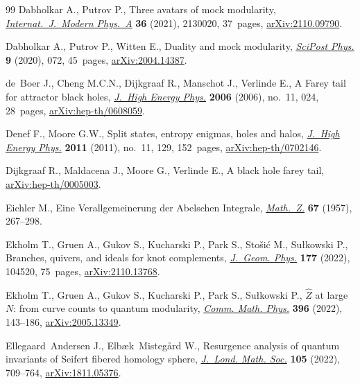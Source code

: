 \documentclass[10pt,a4paper]{amsart}
\theoremstyle{definition}
\numberwithin{equation}{section}
\begin{document}
\begin{thebibliography}{99}
Dabholkar A., Putrov P., Three avatars of mock modularity,
 \href{https://doi.org/10.1142/S0217751X21300209}{\textit{Internat.~J.~Modern Phys.~A}} \textbf{36} (2021), 2130020, 37~pages,
 \href{https://arxiv.org/abs/2110.09790}{arXiv:2110.09790}.

Dabholkar A., Putrov P., Witten E., Duality and mock modularity,
 \href{https://doi.org/10.21468/scipostphys.9.5.072}{\textit{SciPost Phys.}} \textbf{9} (2020), 072, 45~pages, \href{https://arxiv.org/abs/2004.14387}{arXiv:2004.14387}.

de~Boer J., Cheng M.C.N., Dijkgraaf R., Manschot J., Verlinde E., A {F}arey
 tail for attractor black holes, \href{https://doi.org/10.1088/1126-6708/2006/11/024}{\textit{J.~High Energy Phys.}} \textbf{2006}
 (2006), no.~11, 024, 28~pages, \href{https://arxiv.org/abs/hep-th/0608059}{arXiv:hep-th/0608059}.

Denef F., Moore G.W., Split states, entropy enigmas, holes and halos,
 \href{https://doi.org/10.1007/JHEP11(2011)129}{\textit{J.~High Energy Phys.}} \textbf{2011} (2011), no.~11, 129, 152~pages,
 \href{https://arxiv.org/abs/hep-th/0702146}{arXiv:hep-th/0702146}.

Dijkgraaf R., Maldacena J., Moore G., Verlinde E., A black hole farey tail,
 \href{https://arxiv.org/abs/hep-th/0005003}{arXiv:hep-th/0005003}.

Eichler M., Eine {V}erallgemeinerung der {A}belschen {I}ntegrale,
 \href{https://doi.org/10.1007/BF01258863}{\textit{Math.~Z.}} \textbf{67} (1957), 267--298.

Ekholm T., Gruen A., Gukov S., Kucharski P., Park S., Sto\v{s}i\'c M.,
 Su{\l}kowski P., Branches, quivers, and ideals for knot complements,
 \href{https://doi.org/10.1016/j.geomphys.2022.104520}{\textit{J.~Geom. Phys.}} \textbf{177} (2022), 104520, 75~pages,
 \href{https://arxiv.org/abs/2110.13768}{arXiv:2110.13768}.

Ekholm T., Gruen A., Gukov S., Kucharski P., Park S., Su{\l}kowski P.,
 {$\hat{Z}$} at large {$N$}: from curve counts to quantum modularity,
 \href{https://doi.org/10.1007/s00220-022-04469-9}{\textit{Comm. Math. Phys.}} \textbf{396} (2022), 143--186,
 \href{https://arxiv.org/abs/2005.13349}{arXiv:2005.13349}.

Ellegaard~Andersen J., Elb{\ae}k~Misteg{\r{a}}rd W., Resurgence analysis of
 quantum invariants of {S}eifert fibered homology sphere, \href{https://doi.org/10.1112/jlms.12506}{\textit{J.~Lond.
 Math. Soc.}} \textbf{105} (2022), 709--764, \href{https://arxiv.org/abs/1811.05376}{arXiv:1811.05376}.


\end{thebibliography}
\end{document}
